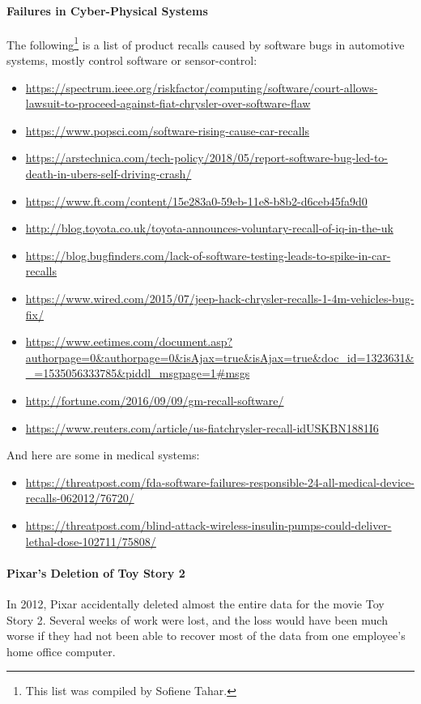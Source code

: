 \paragraph{Failures in Cyber-Physical Systems}
The following\footnote{This list was compiled by Sofiene Tahar.} is a list of product recalls caused by software bugs in automotive systems, mostly control software or sensor-control:
\begin{itemize}
\item \url{https://spectrum.ieee.org/riskfactor/computing/software/court-allows-lawsuit-to-proceed-against-fiat-chrysler-over-software-flaw}
\item \url{https://www.popsci.com/software-rising-cause-car-recalls}
\item \url{https://arstechnica.com/tech-policy/2018/05/report-software-bug-led-to-death-in-ubers-self-driving-crash/}
\item \url{https://www.ft.com/content/15e283a0-59eb-11e8-b8b2-d6ceb45fa9d0}
\item \url{http://blog.toyota.co.uk/toyota-announces-voluntary-recall-of-iq-in-the-uk}
\item \url{https://blog.bugfinders.com/lack-of-software-testing-leads-to-spike-in-car-recalls}
\item \url{https://www.wired.com/2015/07/jeep-hack-chrysler-recalls-1-4m-vehicles-bug-fix/}
\item \url{https://www.eetimes.com/document.asp?authorpage=0&authorpage=0&isAjax=true&isAjax=true&doc_id=1323631&_=1535056333785&piddl_msgpage=1#msgs}
\item \url{http://fortune.com/2016/09/09/gm-recall-software/}
\item \url{https://www.reuters.com/article/us-fiatchrysler-recall-idUSKBN1881I6}
\end{itemize}

And here are some in medical systems:
\begin{itemize}
\item \url{https://threatpost.com/fda-software-failures-responsible-24-all-medical-device-recalls-062012/76720/}
\item \url{https://threatpost.com/blind-attack-wireless-insulin-pumps-could-deliver-lethal-dose-102711/75808/}
\end{itemize}

\paragraph{Pixar's Deletion of Toy Story 2}
In 2012, Pixar accidentally deleted almost the entire data for the movie Toy Story 2.
Several weeks of work were lost, and the loss would have been much worse if they had not been able to recover most of the data from one employee's home office computer.


